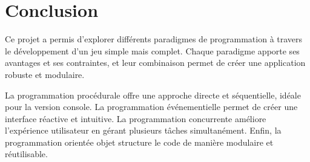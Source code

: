 \documentclass{article}
\begin{document}
\section{Conclusion}

Ce projet a permis d'explorer différents paradigmes de programmation à travers le développement d'un jeu simple mais complet. Chaque paradigme apporte ses avantages et ses contraintes, et leur combinaison permet de créer une application robuste et modulaire.

La programmation procédurale offre une approche directe et séquentielle, idéale pour la version console. La programmation événementielle permet de créer une interface réactive et intuitive. La programmation concurrente améliore l'expérience utilisateur en gérant plusieurs tâches simultanément. Enfin, la programmation orientée objet structure le code de manière modulaire et réutilisable.
\end{document}
